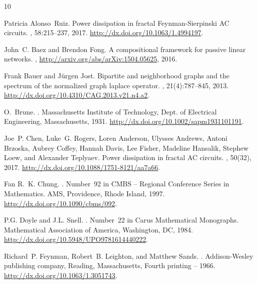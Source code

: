 \documentclass[a4paper,11pt]{amsart}
\theoremstyle{definition}
\begin{document}

\begin{thebibliography}{10}

Patricia Alonso~Ruiz.
\newblock Power dissipation in fractal {Feynman}-{Sierpinski} {A}{C} circuits.
, 58:215--237, 2017.
\newblock \url{http://dx.doi.org/10.1063/1.4994197}.

John~C. Baez and Brendon Fong.
\newblock A compositional framework for passive linear networks.
, \url{http://arxiv.org/abs/arXiv:1504.05625},
  2016.

Frank Bauer and J\"urgen Jost.
\newblock Bipartite and neighborhood graphs and the spectrum of the normalized
  graph laplace operator.
, 21(4):787--845, 2013.
\newblock \url{http://dx.doi.org/10.4310/CAG.2013.v21.n4.a2}.

O.~Brune.
.
\newblock Massachusetts Institute of Technology, Dept. of Electrical
  Engineering, Massachusetts, 1931.
\newblock \url{http://dx.doi.org/10.1002/sapm1931101191}.

Joe~P. Chen, Luke~G. Rogers, Loren Anderson, Ulysses Andrews, Antoni Brzoska,
  Aubrey Coffey, Hannah Davis, Lee Fisher, Madeline Hansalik, Stephew Loew, and
  Alexander Teplyaev.
\newblock Power dissipation in fractal {A}{C} circuits.
, 50(32),
  2017.
\newblock \url{http://dx.doi.org/10.1088/1751-8121/aa7a66}.

Fan R.~K. Chung.
.
\newblock Number~92 in CMBS -- Regional Conference Series in Mathematics. AMS,
  Providence, Rhode Island, 1997.
\newblock \url{http://dx.doi.org/10.1090/cbms/092}.

P.G. Doyle and J.L. Snell.
.
\newblock Number~22 in Carus Mathematical Monographs. Mathematical Association
  of America, Washington, DC, 1984.
\newblock \url{http://dx.doi.org/10.5948/UPO9781614440222}.

Richard~P. Feynman, Robert~B. Leighton, and Matthew Sands.
.
\newblock Addison-Wesley publishing company, Reading, Massachusetts, Fourth
  printing -- 1966.
\newblock \url{http://dx.doi.org/10.1063/1.3051743}.


\end{thebibliography}
\end{document}
